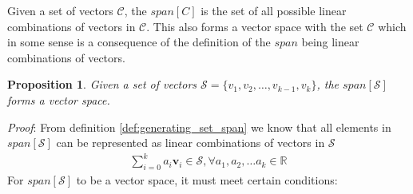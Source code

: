 \documentclass[a4paper,12pt]{book}
\newcommand{\set}[1]{\mathcal{#1}}
\newcommand{\vectr}[1]{\textbf{#1}}
\newcommand{\real}{\mathbb{R}}
\newcommand{\italic}[1]{\textit{#1}}
\newcommand{\lcomb}[1]{\sum_{i = 0}^{k} {#1} \vectr{v}_i}
\newtheorem{proposition}{Proposition}[section]
\begin{document}
	Given a set of vectors $ \set{C} $, the $span[C]$ is the set of all possible linear combinations of vectors in $ \set{C} $. This also forms a vector space with the set $ \set{C} $ which in some sense is a consequence of the definition of the $ span $ being linear combinations of vectors. 
	
	\begin{proposition}
		\normalfont Given a set of vectors $ \set{S} = \{v_1, v_2, \ldots, v_{k - 1}, v_k\} $, the $ span[\set{S}] $ forms a vector space.
		\label{prop:span_is_vector_space}
	\end{proposition}
	\italic{Proof}: From definition \ref{def:generating_set_span} we know that all elements in $ span[\set{S}] $ can be represented as linear combinations of vectors in $ \set{S} $
	\begin{align}
		\lcomb{a_i} \in \set{S}, \forall a_1, a_2, \ldots a_k \in \real
	\end{align}
	For $ span[\set{S}] $ to be a vector space, it must meet certain conditions:
\end{document}
